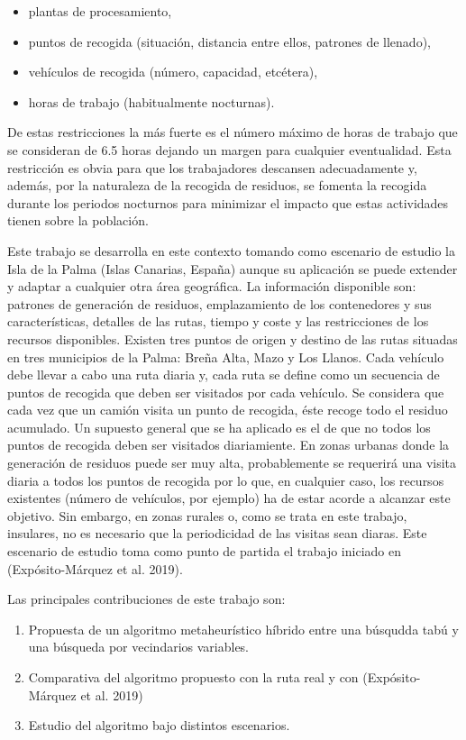 \documentclass[
]{article}
\providecommand{\tightlist}{%
  \setlength{\itemsep}{0pt}\setlength{\parskip}{0pt}}
\begin{document}
\begin{itemize}
\tightlist
\item
  plantas de procesamiento,
\item
  puntos de recogida (situación, distancia entre ellos, patrones de
  llenado),
\item
  vehículos de recogida (número, capacidad, etcétera),
\item
  horas de trabajo (habitualmente nocturnas).
\end{itemize}

De estas restricciones la más fuerte es el número máximo de horas de
trabajo que se consideran de 6.5 horas dejando un margen para cualquier
eventualidad. Esta restricción es obvia para que los trabajadores
descansen adecuadamente y, además, por la naturaleza de la recogida de
residuos, se fomenta la recogida durante los periodos nocturnos para
minimizar el impacto que estas actividades tienen sobre la población.

Este trabajo se desarrolla en este contexto tomando como escenario de
estudio la Isla de la Palma (Islas Canarias, España) aunque su
aplicación se puede extender y adaptar a cualquier otra área geográfica.
La información disponible son: patrones de generación de residuos,
emplazamiento de los contenedores y sus características, detalles de las
rutas, tiempo y coste y las restricciones de los recursos disponibles.
Existen tres puntos de origen y destino de las rutas situadas en tres
municipios de la Palma: Breña Alta, Mazo y Los Llanos. Cada vehículo
debe llevar a cabo una ruta diaria y, cada ruta se define como un
secuencia de puntos de recogida que deben ser visitados por cada
vehículo. Se considera que cada vez que un camión visita un punto de
recogida, éste recoge todo el residuo acumulado. Un supuesto general que
se ha aplicado es el de que no todos los puntos de recogida deben ser
visitados diariamiente. En zonas urbanas donde la generación de residuos
puede ser muy alta, probablemente se requerirá una visita diaria a todos
los puntos de recogida por lo que, en cualquier caso, los recursos
existentes (número de vehículos, por ejemplo) ha de estar acorde a
alcanzar este objetivo. Sin embargo, en zonas rurales o, como se trata
en este trabajo, insulares, no es necesario que la periodicidad de las
visitas sean diaras. Este escenario de estudio toma como punto de
partida el trabajo iniciado en (Expósito-Márquez et al. 2019).

Las principales contribuciones de este trabajo son:

\begin{enumerate}
\def\labelenumi{\arabic{enumi}.}
\tightlist
\item
  Propuesta de un algoritmo metaheurístico híbrido entre una búsqudda
  tabú y una búsqueda por vecindarios variables.
\item
  Comparativa del algoritmo propuesto con la ruta real y con
  (Expósito-Márquez et al. 2019)
\item
  Estudio del algoritmo bajo distintos escenarios.
\end{enumerate}
\end{document}

